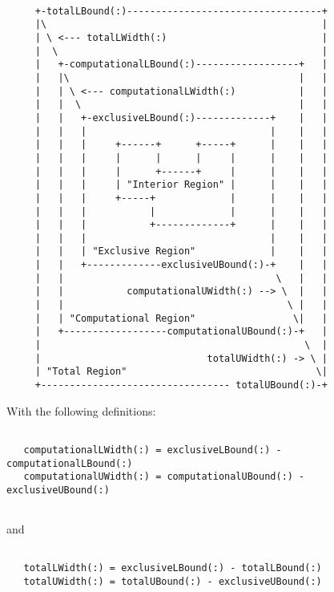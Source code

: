    \begin{verbatim}
  
     +-totalLBound(:)----------------------------------+
     |\                                                |
     | \ <--- totalLWidth(:)                           |
     |  \                                              |
     |   +-computationalLBound(:)------------------+   |
     |   |\                                        |   |
     |   | \ <--- computationalLWidth(:)           |   |
     |   |  \                                      |   |
     |   |   +-exclusiveLBound(:)-------------+    |   |
     |   |   |                                |    |   |
     |   |   |     +------+      +-----+      |    |   |
     |   |   |     |      |      |     |      |    |   |
     |   |   |     |      +------+     |      |    |   |
     |   |   |     | "Interior Region" |      |    |   |
     |   |   |     +-----+             |      |    |   |
     |   |   |           |             |      |    |   |
     |   |   |           +-------------+      |    |   |
     |   |   |                                |    |   |
     |   |   | "Exclusive Region"             |    |   |
     |   |   +-------------exclusiveUBound(:)-+    |   |
     |   |                                     \   |   |
     |   |           computationalUWidth(:) --> \  |   |
     |   |                                       \ |   |
     |   | "Computational Region"                 \|   |
     |   +------------------computationalUBound(:)-+   |
     |                                              \  | 
     |                             totalUWidth(:) -> \ | 
     | "Total Region"                                 \| 
     +--------------------------------- totalUBound(:)-+
   \end{verbatim}
  
  
   With the following definitions:
   \begin{verbatim}
  
   computationalLWidth(:) = exclusiveLBound(:) - computationalLBound(:)
   computationalUWidth(:) = computationalUBound(:) - exclusiveUBound(:)
  
   \end{verbatim}
   and
   \begin{verbatim}
  
   totalLWidth(:) = exclusiveLBound(:) - totalLBound(:)
   totalUWidth(:) = totalUBound(:) - exclusiveUBound(:)
  
   \end{verbatim}
  
